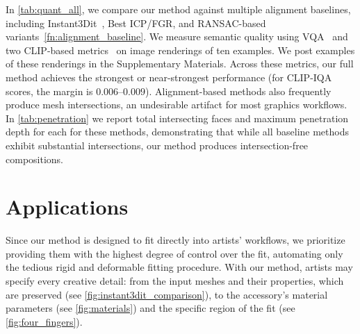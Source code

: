 In \autoref{tab:quant_all}, we  compare our method against multiple alignment baselines, including Instant3Dit~\cite{barda2025instant3dit}, Best ICP/FGR, and RANSAC-based variants~\ref{fn:alignment_baseline}.  
We measure semantic quality using VQA~\cite{lin2024evaluating} and two CLIP-based metrics~\cite{radford2021learning,wang2023exploring} on image renderings of ten examples. We post examples of these renderings in the Supplementary Materials.
Across these metrics, our full method achieves the strongest or near-strongest performance (for CLIP-IQA scores, the margin is $0.006\text{--}0.009$).
Alignment-based methods also frequently produce mesh intersections, an undesirable artifact for most graphics workflows. 
In \autoref{tab:penetration} we report total intersecting faces and maximum penetration depth for each for these methods, demonstrating that while all baseline methods exhibit substantial intersections, our method produces intersection-free compositions. 







\section{Applications} \label{sec:applications}
Since our method is designed to fit directly into artists' workflows, we prioritize providing them with the highest degree of control over the fit, automating only the tedious rigid and deformable fitting procedure.
With our method, artists may specify every creative detail: from the input meshes and their properties, which are preserved (see \autoref{fig:instant3dit_comparison}), to the accessory's material parameters (see \autoref{fig:materials}) and the specific region of the fit (see \autoref{fig:four_fingers}).


